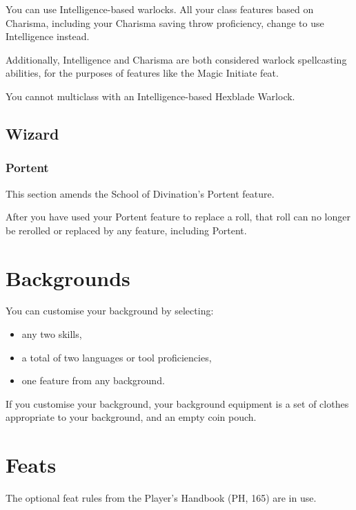 \documentclass[letterpaper,twocolumn,openany,nodeprecatedcode]{dndbook}
\begin{document}
You can use Intelligence-based warlocks. All your class features based on Charisma, including your Charisma saving throw proficiency, change to use Intelligence instead.

Additionally, Intelligence and Charisma are both considered warlock spellcasting abilities, for the purposes of features like the Magic Initiate feat.

You cannot multiclass with an Intelligence-based Hexblade Warlock.

\subsection{Wizard}

\subsubsection{Portent}
This section amends the School of Divination's Portent feature.

After you have used your Portent feature to replace a roll, that roll can no longer be rerolled or replaced by any feature, including Portent.




\section{Backgrounds}
You can customise your background by selecting:

\begin{itemize}
    \item any two skills,
    \item a total of two languages or tool proficiencies,
    \item one feature from any background.
\end{itemize}

If you customise your background, your background equipment is a set of clothes appropriate to your background, and an empty coin pouch.





\section{Feats}
The optional feat rules from the Player's Handbook (PH, 165) are in use.
\end{document}
